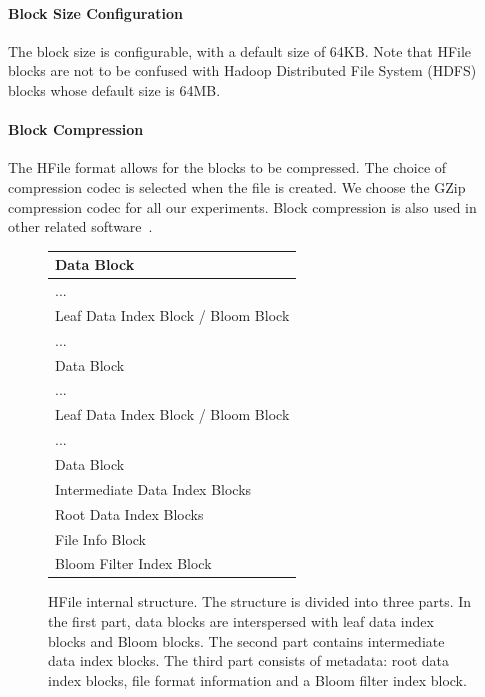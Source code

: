 \paragraph{Block Size Configuration} The block size is
configurable, with a default size of 64KB. Note that HFile blocks are not to be
confused with Hadoop Distributed File System (HDFS) blocks whose default size is
64MB.

\paragraph{Block Compression} The HFile format allows for
the blocks to be compressed. The choice of compression codec is selected when
the file is created. We choose the GZip compression codec for all our
experiments. Block compression is also used in other related
software~\citep{pauls-klein:2011:HLTACL}.

\begin{figure}
  \begin{center}
    \begin{tabular}{|l|}
      \hline
      \rowcolor[gray]{0.85}
      Data Block \\
      \hline
      \rowcolor[gray]{0.86}
      ... \\
      \hline
      \rowcolor[gray]{0.95}
      Leaf Data Index Block / Bloom Block \\
      \hline
      \rowcolor[gray]{0.86}
      ... \\
      \hline
      \rowcolor[gray]{0.85}
      Data Block \\
      \hline
      \rowcolor[gray]{0.86}
      ... \\
      \hline
      \rowcolor[gray]{0.95}
      Leaf Data Index Block / Bloom Block \\
      \hline
      \rowcolor[gray]{0.86}
      ... \\
      \hline
      \rowcolor[gray]{0.85}
      Data Block \\
      \hline
      \rowcolor[gray]{0.7}
      Intermediate Data Index Blocks \\
      \hline
      \rowcolor[gray]{0.6}
      Root Data Index Blocks \\
      \hline
      \rowcolor[gray]{0.6}
      File Info Block \\
      \hline
      \rowcolor[gray]{0.6}
      Bloom Filter Index Block \\
      \hline
    \end{tabular}
    \caption[Caption for LOF]{HFile internal structure.\footnotemark
    The structure is divided into three parts. In the first part, data blocks
    are interspersed with leaf data index blocks and Bloom blocks. The second
    part contains intermediate data index blocks. The third part consists
    of metadata: root data index blocks, file format information and a Bloom
    filter index block.}
    \label{fig:hfile}
  \end{center}
\end{figure}

